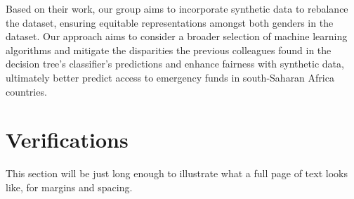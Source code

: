 \documentclass[12pt]{article}
\begin{document}
Based on their work, our group aims to incorporate synthetic data to
rebalance the dataset, ensuring equitable representations amongst both
genders in the dataset. Our approach aims to consider a broader
selection of machine learning algorithms and mitigate the disparities
the previous colleagues found in the decision tree's classifier's
predictions and enhance fairness with synthetic data, ultimately better
predict access to emergency funds in south-Saharan Africa countries.

\section{Verifications}
\label{sec:verify}

This section will be just long enough to illustrate what a full page of
text looks like, for margins and spacing.

\citet{Campbell02} \citeauthor{Schubert13}
\citetext{\citeyear{Schubert13}; \citealp{Chi81}}



\end{document}
